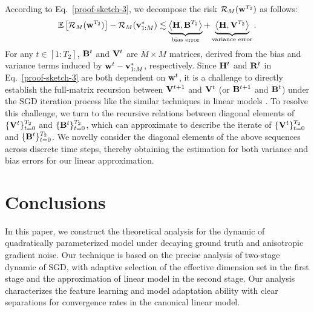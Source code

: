 According to Eq.~\eqref{proof-sketch-3}, we decompose the risk $\mathcal{R}_M(\mathbf{w}^{T_2})$ as follows:
\begin{align}\label{phase-II-eq1}
    \mathbb{E}\left[\mathcal{R}_M(\mathbf{w}^{T_2})\right]-\mathcal{R}_M(\mathbf{v}_{1:M}^*)\lesssim\underbrace{\left\langle\mathbf{H},\mathbf{B}^{T_2}\right\rangle}_{\text{bias error}}+\underbrace{\left\langle\mathbf{H},\mathbf{V}^{T_2}\right\rangle}_{\text{variance error}}.
\end{align}
For any $t\in[1:T_2]$, $\mathbf{B}^t$ and $\mathbf{V}^t$ are $M\times M$ matrices, derived from the bias and variance terms induced by $\mathbf{w}^t-\mathbf{v}_{1:M}^*$, respectively. 
Since $\mathbf{H}^t$ and $\mathbf{R}^t$ in Eq.~\eqref{proof-sketch-3} are both dependent on $\mathbf{w}^t$, it is a challenge to directly establish the full-matrix recursion between $\mathbf{V}^{t+1}$ and $\mathbf{V}^t$ (or $\mathbf{B}^{t+1}$ and $\mathbf{B}^t$) under the SGD iteration process like the similar techniques in linear models \citep{wu2022last}. To resolve this challenge, we turn to the recursive relations between diagonal elements of $\{\mathbf{V}^t\}_{t=0}^{T_2}$ and $\{\mathbf{B}^t\}_{t=0}^{T_2}$, which can approximate to describe the iterate of $\{\mathbf{V}^t\}_{t=0}^{T_2}$ and $\{\mathbf{B}^t\}_{t=0}^{T_2}$. We novelly consider the diagonal elements of the above sequences across discrete time steps, thereby obtaining the estimation for both variance and bias errors for our linear approximation. 



\section{Conclusions}
In this paper, we construct the theoretical analysis for the dynamic of quadratically parameterized model under decaying ground truth and anisotropic gradient noise. Our technique is based on the precise analysis of two-stage dynamic of SGD, with adaptive selection of the effective dimension set in the first stage and the approximation of linear model in the second stage. Our analysis characterizes the feature learning and model adaptation ability with clear separations for convergence rates in the canonical linear model.



